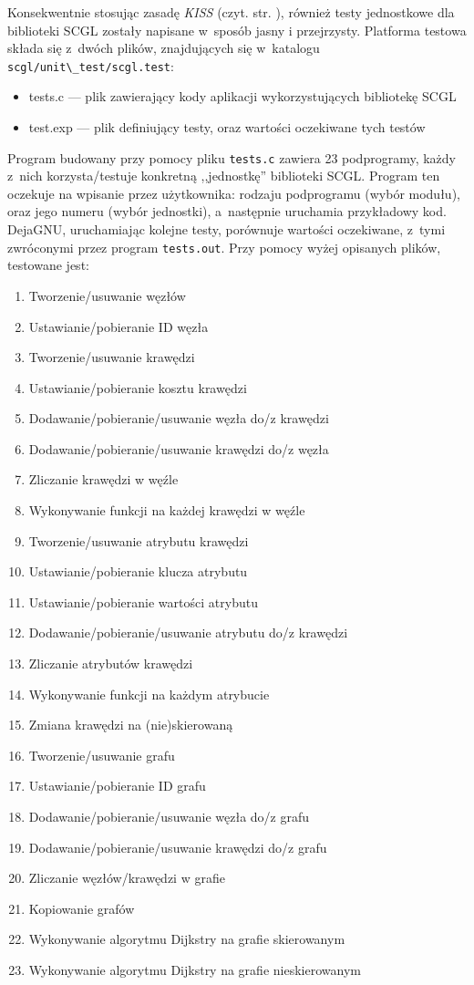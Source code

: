 \documentclass[a4paper,12pt,polish,oneside]{thesis}
\newcommand\code[1]{\lstinline[style=line]{#1}}
\begin{document}
Konsekwentnie stosując zasadę \emph{KISS} (czyt. str. \pageref{kiss}), również testy jednostkowe dla biblioteki SCGL zostały napisane w~sposób jasny i przejrzysty.
Platforma testowa składa się z~dwóch plików, znajdujących się w~katalogu \code{scgl/unit\_test/scgl.test}:
\begin{itemize}
	\item tests.c --- plik zawierający kody aplikacji wykorzystujących bibliotekę SCGL
	\item test.exp --- plik definiujący testy, oraz wartości oczekiwane tych testów
\end{itemize}
Program budowany przy pomocy pliku \code{tests.c} zawiera 23 podprogramy, każdy z~nich korzysta/testuje konkretną ,,jednostkę'' biblioteki SCGL.
Program ten oczekuje na wpisanie przez użytkownika: rodzaju podprogramu (wybór modułu), oraz jego numeru (wybór jednostki), a~następnie uruchamia przykładowy kod.
DejaGNU, uruchamiając kolejne testy, porównuje wartości oczekiwane, z~tymi zwróconymi przez program \code{tests.out}.
Przy pomocy wyżej opisanych plików, testowane jest:
\begin{enumerate}
	\item Tworzenie/usuwanie węzłów
	\item Ustawianie/pobieranie ID węzła
	\item Tworzenie/usuwanie krawędzi
	\item Ustawianie/pobieranie kosztu krawędzi
	\item Dodawanie/pobieranie/usuwanie węzła do/z krawędzi
	\item Dodawanie/pobieranie/usuwanie krawędzi do/z węzła
	\item Zliczanie krawędzi w węźle
	\item Wykonywanie funkcji na każdej krawędzi w węźle
	\item Tworzenie/usuwanie atrybutu krawędzi
	\item Ustawianie/pobieranie klucza atrybutu
	\item Ustawianie/pobieranie wartości atrybutu
	\item Dodawanie/pobieranie/usuwanie atrybutu do/z krawędzi
	\item Zliczanie atrybutów krawędzi
	\item Wykonywanie funkcji na każdym atrybucie
	\item Zmiana krawędzi na (nie)skierowaną
	\item Tworzenie/usuwanie grafu
	\item Ustawianie/pobieranie ID grafu
	\item Dodawanie/pobieranie/usuwanie węzła do/z grafu
	\item Dodawanie/pobieranie/usuwanie krawędzi do/z grafu
	\item Zliczanie węzłów/krawędzi w grafie
	\item Kopiowanie grafów
	\item Wykonywanie algorytmu Dijkstry na grafie skierowanym
	\item Wykonywanie algorytmu Dijkstry na grafie nieskierowanym
\end{enumerate}
\end{document}
